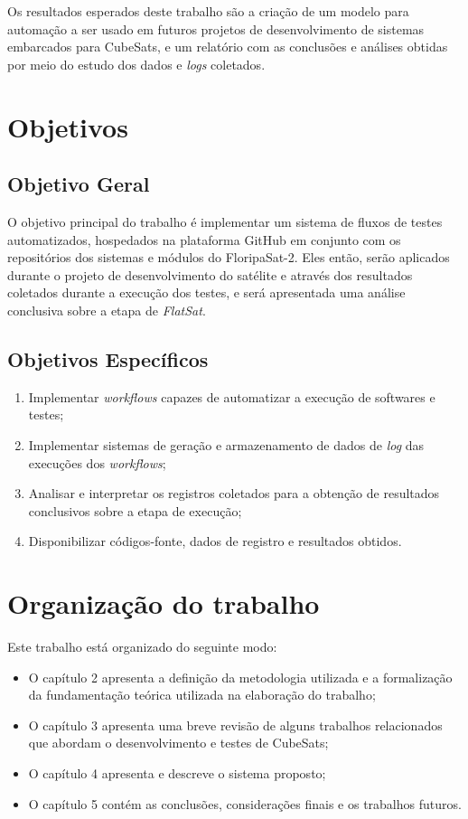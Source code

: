 Os resultados esperados deste trabalho são a criação de um modelo para automação a ser usado em futuros projetos de
desenvolvimento de sistemas embarcados para CubeSats, e um relatório com as conclusões e análises obtidas por meio do
estudo dos dados e \emph{logs} coletados.

\section{Objetivos}

\subsection{Objetivo Geral}

O objetivo principal do trabalho é implementar um sistema de fluxos de testes automatizados, hospedados na plataforma
GitHub em conjunto com os repositórios dos sistemas e módulos do FloripaSat-2. Eles então, serão aplicados durante o
projeto de desenvolvimento do satélite e através dos resultados coletados durante a execução dos testes, e será
apresentada uma análise conclusiva sobre a etapa de \emph{FlatSat}.
\subsection{Objetivos Específicos}

\begin{enumerate}
    \item Implementar \textit{workflows} capazes de automatizar a execução de softwares e testes;
    \item Implementar sistemas de geração e armazenamento de dados de \textit{log} das execuções dos \textit{workflows};
    \item Analisar e interpretar os registros coletados para a obtenção de resultados conclusivos sobre a etapa de execução;
    \item Disponibilizar códigos-fonte, dados de registro e resultados obtidos.
\end{enumerate}
\section{Organização do trabalho}

Este trabalho está organizado do seguinte modo:

\begin{itemize}
    \item O capítulo 2 apresenta a definição da metodologia utilizada e a formalização da fundamentação teórica utilizada
          na elaboração do trabalho;
    \item O capítulo 3 apresenta uma breve revisão de alguns trabalhos relacionados que abordam o desenvolvimento e testes
          de CubeSats;
    \item O capítulo 4 apresenta e descreve o sistema proposto;
    \item O capítulo 5 contém as conclusões, considerações finais e os trabalhos futuros.
\end{itemize}
